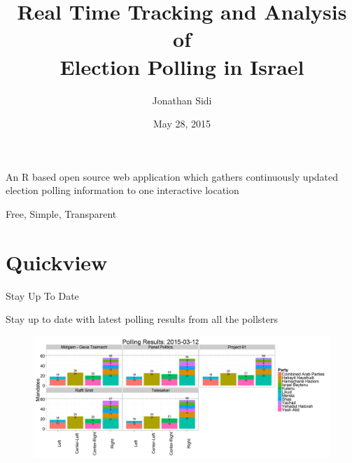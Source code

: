 \documentclass[11pt]{beamer}
\author{Jonathan Sidi}
\title[Election Analysis]{Real Time Tracking and Analysis of \\ Election Polling in Israel}
\institute[HUJI Statistics]{Department of Statistics, Hebrew University of Jerusalem}
\date{May 28, 2015}
\begin{document}
\maketitle

\begin{frame}
\begin{block}{}
An R based open source web application which gathers continuously updated election polling information to one interactive location
\end{block}

\vspace{1cm}

\centering
Free, Simple, Transparent
\end{frame}

\section{Quickview}
\begin{frame}{Stay Up To Date}
\begin{block}{}
Stay up to date with latest polling results from all the pollsters
\end{block}
				\begin{figure}[h]
				\centering
				\includegraphics[width=1\linewidth]{../www/LastDayPlot}
				\label{fig:LastDayPlot}
				\end{figure}
\end{frame}
\end{document}
